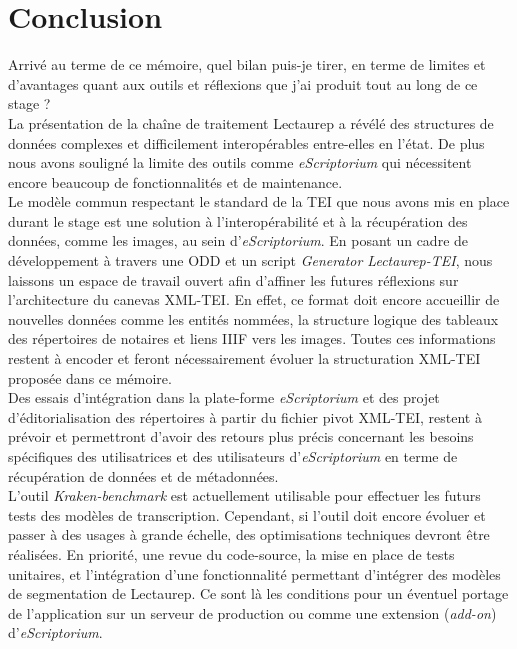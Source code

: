 \part*{Conclusion}

Arrivé au terme de ce mémoire, quel bilan puis-je tirer, en terme de limites et d'avantages quant aux outils et réflexions que j'ai produit tout au long de ce stage ?\\

La présentation de la chaîne de traitement Lectaurep a révélé des structures de données complexes et difficilement interopérables entre-elles en l'état. De plus nous avons souligné la limite des outils comme \textit{eScriptorium} qui nécessitent encore beaucoup de fonctionnalités et de maintenance.\\

Le modèle commun respectant le standard de la TEI que nous avons mis en place durant le stage est une solution à l'interopérabilité et à la récupération des données, comme les images, au sein d'\textit{eScriptorium}. En posant un cadre de développement à travers une ODD et un script \textit{Generator Lectaurep-TEI}, nous laissons un espace de travail ouvert afin d'affiner les futures réflexions sur l'architecture du canevas XML-TEI. En effet, ce format doit encore accueillir de nouvelles données comme les entités nommées, la structure logique des tableaux des répertoires de notaires et liens IIIF vers les images. Toutes ces informations restent à encoder et feront nécessairement évoluer la structuration XML-TEI proposée dans ce mémoire.\\

Des essais d'intégration dans la plate-forme \textit{eScriptorium} et des projet d'éditorialisation des répertoires à partir du fichier pivot XML-TEI, restent à prévoir et permettront d'avoir des retours plus précis concernant les besoins spécifiques des utilisatrices et des utilisateurs d'\textit{eScriptorium} en terme de récupération de données et de métadonnées.\\

L'outil \textit{Kraken-benchmark} est actuellement utilisable pour effectuer les futurs tests des modèles de transcription. Cependant, si l'outil doit encore évoluer et passer à des usages à grande échelle, des optimisations techniques devront être réalisées. En priorité, une revue du code-source, la mise en place de tests unitaires, et l'intégration d'une fonctionnalité permettant d'intégrer des modèles de segmentation de Lectaurep. Ce sont là les conditions pour un éventuel portage de l'application sur un serveur de production ou comme une extension (\textit{add-on}) d'\textit{eScriptorium}.\\


